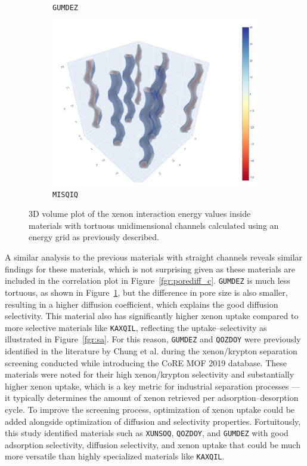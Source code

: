 \documentclass[main]{subfiles}
\begin{document}
\begin{figure}[ht]
\begin{subfigure}[b]{0.32\textwidth}
      \caption{\texttt{GUMDEZ}~\cite{Yin_2014}}\label{fgr:zigzag_b}
  \end{subfigure}
  \hfill
  \begin{subfigure}[b]{0.32\textwidth}
      \centering
      \includegraphics[width=\textwidth]{figures/5-diffusion/viz/MISQIQ.jpg}
      \caption{\texttt{MISQIQ}~\cite{Tong_2013}}\label{fgr:zigzag_c}
  \end{subfigure}
     \caption{ 3D volume plot of the xenon interaction energy values inside materials with tortuous unidimensional channels calculated using an energy grid as previously described.}\label{fgr:zigzag}
\end{figure}

A similar analysis to the previous materials with straight channels reveals similar findings for these materials, which is not surprising given as these materials are included in the correlation plot in Figure~\ref{fgr:porediff_c}. \texttt{GUMDEZ} is much less tortuous, as shown in Figure~\ref{fgr:zigzag_b}, but the difference in pore size is also smaller, resulting in a higher diffusion coefficient, which explains the good diffusion selectivity. This material also has significantly higher xenon uptake compared to more selective materials like \texttt{KAXQIL}, reflecting the uptake--selectivity as illustrated in Figure~\ref{fgr:sa}. For this reason, \texttt{GUMDEZ} and \texttt{QOZDOY} were previously identified in the literature by Chung et al.\autocite{Chung_2019} during the xenon/krypton separation screening conducted while introducing the CoRE MOF 2019 database. These materials were noted for their high xenon/krypton selectivity and substantially higher xenon uptake, which is a key metric for industrial separation processes --- it typically determines the amount of xenon retrieved per adsorption--desorption cycle. To improve the screening process, optimization of xenon uptake could be added alongside optimization of diffusion and selectivity properties. Fortuitously, this study identified materials such as \texttt{XUNSOQ}, \texttt{QOZDOY}, and \texttt{GUMDEZ} with good adsorption selectivity, diffusion selectivity, and xenon uptake that could be much more versatile than highly specialized materials like \texttt{KAXQIL}.
\end{document}
